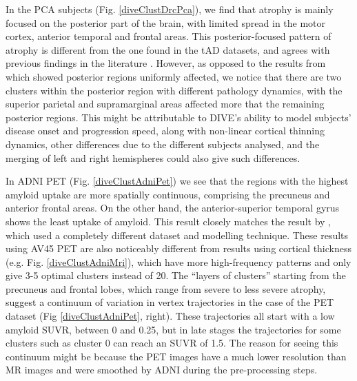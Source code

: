 In the PCA subjects (Fig. \ref{diveClustDrcPca}), we find that atrophy is mainly focused on the posterior part of the brain, with limited spread in the motor cortex, anterior temporal and frontal areas. This posterior-focused pattern of atrophy is different from the one found in the tAD datasets, and agrees with previous findings in the literature \cite{crutch2012posterior,lehmann2011cortical}.  However, as opposed to the results from \cite{lehmann2011cortical} which showed posterior regions uniformly affected, we notice that there are two clusters within the posterior region with different pathology dynamics, with the superior parietal and supramarginal areas affected more that the remaining posterior regions. This might be attributable to DIVE's ability to model subjects' disease onset and progression speed, along with non-linear cortical thinning dynamics, other differences due to the different subjects analysed, and the merging of left and right hemispheres could also give such differences.

In ADNI PET (Fig. \ref{diveClustAdniPet}) we see that the regions with the highest amyloid uptake are more spatially continuous, comprising the precuneus and anterior frontal areas. On the other hand, the anterior-superior temporal gyrus shows the least uptake of amyloid. This result closely matches the result by \cite{bilgel2016multivariate}, which used a completely different dataset and modelling technique. These results using AV45 PET are also noticeably different from results using cortical thickness (e.g. Fig. \ref{diveClustAdniMri}), which have more high-frequency patterns and only give 3-5 optimal clusters instead of 20. The “layers of clusters” starting from the precuneus and frontal lobes, which range from severe to less severe atrophy, suggest a continuum of variation in vertex trajectories in the case of the PET dataset (Fig \ref{diveClustAdniPet}, right). These trajectories all start with a low amyloid SUVR, between 0 and 0.25, but in late stages the trajectories for some clusters such as cluster 0 can reach an SUVR of 1.5. The reason for seeing this continuum might be because the PET images have a much lower resolution than MR images and were smoothed by ADNI during the pre-processing steps. 

\newcommand{\scalingFactor}{1.2}
\newcommand{\scalingFactorSubfigBrain}{0.35}

\newcommand{\gradLimLeft}{-1.6}
\newcommand{\gradLimRight}{1.6}

\newcommand{\scalingFactorBrains}{0.75}
\newcommand{\scalingFactorTraj}{1.05}

